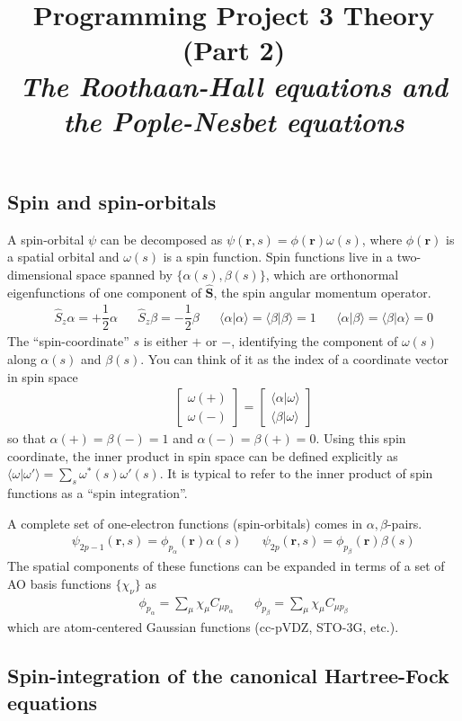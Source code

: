 \documentclass[11pt,fleqn]{article}
\title{Programming Project 3 Theory (Part 2)\\
\textit{The Roothaan-Hall equations and the Pople-Nesbet equations}}
\date{}
\author{}
\renewcommand{\a}{\alpha}    %
\renewcommand{\b}{\beta}     %
\newcommand{\f}{\phi}        %
\newcommand{\x}{\chi}        %
\newcommand{\y}{\psi}        %
\newcommand{\w}{\omega}      %
\newcommand{\op}[1]{\ensuremath{\hat{#1}}}
\newcommand{\bo}[1]{\ensuremath{\mathbf{#1}}}
\newcommand{\fr}[2]{\ensuremath{\dfrac{#1}{#2}}}
\newcommand{\ip}[1]{\ensuremath{\langle#1\rangle}}
\newcommand{\ma}[1]{\ensuremath{\begin{bmatrix}#1\end{bmatrix}}}
\theoremstyle{mystyle}
\begin{document}
\maketitle
\vspace{-2cm}

\noindent
\subsection*{Spin and spin-orbitals}

A spin-orbital $\y$ can be decomposed as $\y(\bo{r},s)=\f(\bo{r})\w(s)$, where $\f(\bo{r})$ is a spatial orbital and $\w(s)$ is a spin function.
Spin functions live in a two-dimensional space spanned by $\{\a(s),\b(s)\}$, which are orthonormal eigenfunctions of one component of $\op{\bo{S}}$, the spin angular momentum operator.
\begin{align}
&&
  \op{S}_z\a
=
  +\fr{1}{2}\a
&&
  \op{S}_z\b
=
  -\fr{1}{2}\b
&&
  \ip{\a|\a}=\ip{\b|\b}=1
&&
  \ip{\a|\b}=\ip{\b|\a}=0
\end{align}
The ``spin-coordinate'' $s$ is either $+$ or $-$, identifying the component of $\w(s)$ along $\a(s)$ and $\b(s)$.
You can think of it as the index of a coordinate vector in spin space
\begin{align*}
&&
  \ma{\w(+)\\\w(-)}
=
  \ma{\ip{\a|\w}\\\ip{\b|\w}}
\end{align*}
so that $\a(+)=\b(-)=1$ and $\a(-)=\b(+)=0$.
Using this spin coordinate, the inner product in spin space can be defined explicitly as $\ip{\w|\w'}=\sum_s\w^*(s)\w'(s)$.
It is typical to refer to the inner product of spin functions as a ``spin integration''.

A complete set of one-electron functions (spin-orbitals) comes in $\a,\b$-pairs.
\begin{align}
\label{spin-orb-general}
&&
	\y_{2p-1}(\bo{r},s)
=
  \f_{p_\a}(\bo{r})\a(s)
&&
  \y_{2p}(\bo{r},s)
=
  \f_{p_\b}(\bo{r})\b(s)
\end{align}
The spatial components of these functions can be expanded in terms of a set of AO basis functions $\{\x_\nu\}$ as 
\begin{align}
\label{space-orb}
&&
  \f_{p_\a}
=
  \sum_\mu \x_\mu C_{\mu p_\a}
&&
  \f_{p_\b}
=
  \sum_\mu \x_\mu C_{\mu p_\b}
\end{align}
which are atom-centered Gaussian functions (cc-pVDZ, STO-3G, etc.).


\subsection*{Spin-integration of the canonical Hartree-Fock equations}
\end{document}
